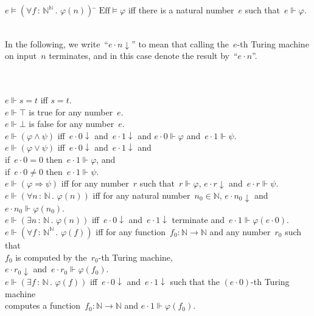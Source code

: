 \documentclass[oneside]{amsart}
\theoremstyle{definition}
\theoremstyle{plain}
\theoremstyle{remark}
\newcommand{\NN}{\mathbb{N}}
\newcommand{\Eff}{\mathrm{Ef{}f}}
\renewcommand{\_}{\mathpunct{.}\,}
\newcommand{\effective}{ef{}fective\xspace}
\newcommand{\?}{\,{:}\,}
\newcommand{\realizes}{\Vdash}
\begin{document}
\begin{table}
  \begin{tabbing}
    $e \models (\forall f\?\NN^\NN\_ \varphi(n))$ \= \kill
    $\Eff \models \varphi$ \> iff there is a natural number~$e$ such that~$e
    \realizes \varphi$. \\\\
    \begin{minipage}{\textwidth}
    In the following, we write~``$e \cdot n \downarrow$'' to mean that calling
    the~$e$-th Turing machine on input~$n$ terminates, and in this case denote
    the result by~``$e \cdot n$''.\end{minipage} \\\\
    $e \realizes s = t$ \> iff $s = t$. \\
    $e \realizes \top$ \> is true for any number~$e$. \\
    $e \realizes \bot$ \> is false for any number~$e$. \\
    $e \realizes (\varphi \wedge \psi)$ \> iff~$e \cdot 0 \downarrow$ and~$e
    \cdot 1 \downarrow$ and $e\cdot0 \realizes \varphi$ and~$e\cdot1 \realizes \psi$. \\
    $e \realizes (\varphi \vee \psi)$ \> iff~$e \cdot 0 \downarrow$ and~$e
    \cdot 1 \downarrow$ and \\ \> \qquad if~$e\cdot0 = 0$ then~$e\cdot1 \realizes
    \varphi$, and \\ \> \qquad if~$e\cdot0 \neq 0$ then~$e\cdot1 \realizes \psi$. \\
    $e \realizes (\varphi \Rightarrow \psi)$ \> iff for any number~$r$
    such that~$r \realizes \varphi$, $e \cdot r \downarrow$ and~$e \cdot r \realizes \psi$. \\
    $e \realizes (\forall n\?\NN\_ \varphi(n))$ \> iff for any natural number~$n_0
    \in \NN$, $e \cdot n_0 \downarrow$ and~$e \cdot n_0 \realizes \varphi(n_0)$. \\
    $e \realizes (\exists n\?\NN\_ \varphi(n))$ \> iff~$e\cdot0 \downarrow$ and~$e\cdot1 \downarrow$
    terminate and~$e\cdot1 \realizes \varphi(e\cdot0)$. \\
    $e \realizes (\forall f\?\NN^\NN\_ \varphi(f))$ \> iff for any function~$f_0
    : \NN \to \NN$ and any number~$r_0$ such that \\ \> \qquad $f_0$ is computed by the~$r_0$-th
    Turing machine, \\ \> \qquad
    $e \cdot r_0 \downarrow$ and~$e \cdot r_0 \realizes \varphi(f_0)$. \\
    $e \realizes (\exists f\?\NN\_ \varphi(f))$ \> iff~$e \cdot 0 \downarrow$
    and~$e \cdot 1 \downarrow$ such that
    the $(e \cdot 0)$-th Turing machine \\ \> \qquad computes a function~$f_0 : \NN \to \NN$
    and $e \cdot 1 \realizes \varphi(f_0)$.
  \end{tabbing}

  \caption{\label{table:eff} A (fragment of) the translation
  rules defining the meaning of statements internal to the \effective topos.}
\end{table}
\end{document}

